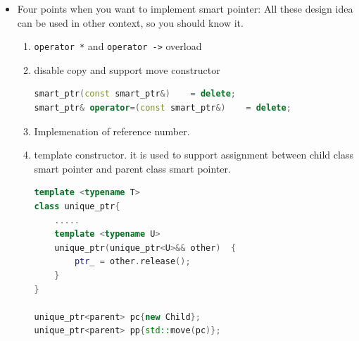 \documentclass[a4paper,11pt,twoside]{book}
\begin{document}
\begin{itemize}
	\item Four points when you want to implement smart pointer: All these design idea can be used in other context, so you should know it. 

	\begin{enumerate}
		\item \texttt{operator *} and \texttt{operator ->} overload
		\item disable copy and support move constructor
\begin{lstlisting}[frame=single, language=c++, mathescape=true]
smart_ptr(const smart_ptr&)    = delete;  
smart_ptr& operator=(const smart_ptr&)    = delete;
\end{lstlisting}

		\item Implemenation of reference number. 
		
		\item template constructor. it is used to support assignment between child class smart pointer and parent class smart pointer.
		
\begin{lstlisting}[frame=single, language=c++, mathescape=true]
template <typename T>
class unique_ptr{
	.....
	template <typename U>  
	unique_ptr(unique_ptr<U>&& other)  {
		ptr_ = other.release();  
	}
}

unique_ptr<parent> pc{new Child};
unique_ptr<parent> pp{std::move(pc)};
\end{lstlisting}

	\end{enumerate}

\end{itemize}
\end{document}
